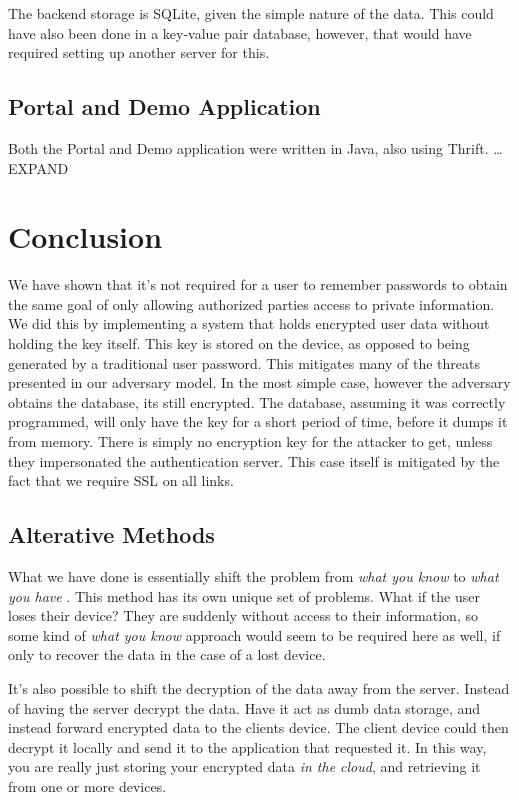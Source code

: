 \documentclass[letterpaper,twocolumn,10pt]{article}
\begin{document}
The backend storage is SQLite, given the simple nature of the data. This could have also been done in a key-value pair database, however, that would have required setting up another server for this.

\subsection{Portal and Demo Application}
Both the Portal and Demo application were written in Java, also using Thrift. \dots EXPAND


\section{Conclusion}
    We have shown that it's not required for a user to remember passwords to obtain the same goal of only allowing authorized parties access to private information. We did this by implementing a system that holds encrypted user data without holding the key itself. This key is stored on the device, as opposed to being generated by a traditional user password. This mitigates many of the threats presented in our adversary model. In the most simple case, however the adversary obtains the database, its still encrypted. The database, assuming it was correctly programmed, will only have the key for a short period of time, before it dumps it from memory. There is simply no encryption key for the attacker to get, unless they impersonated the authentication server. This case itself is mitigated by the fact that we require SSL on all links.

\subsection{Alterative Methods}

What we have done is essentially shift the problem from \textit{what you know} to \textit{what you have} \cite[Chapter~9]{privcomm}. This method has its own unique set of problems. What if the user loses their device? They are suddenly without access to their information, so some kind of \textit{what you know} approach would seem to be required here as well, if only to recover the data in the case of a lost device.

It's also possible to shift the decryption of the data away from the server. Instead of having the server decrypt the data. Have it act as dumb data storage, and instead forward encrypted data to the clients device. The client device could then decrypt it locally and send it to the application that requested it. In this way, you are really just storing your encrypted data \textit{in the cloud}, and retrieving it from one or more devices. 



{
    \small
    
    
}
\end{document}
